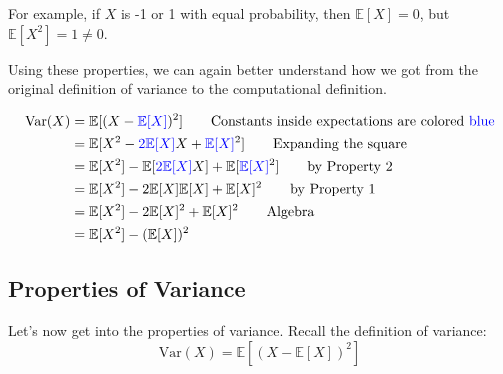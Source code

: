 \documentclass[
  letterpaper,
  DIV=11,
  numbers=noendperiod]{scrreprt}
\begin{document}
For example, if \(X\) is -1 or 1 with equal probability, then
\(\mathbb{E}[X] = 0\), but \(\mathbb{E}[X^2] = 1 \neq 0\).

Using these properties, we can again better understand how we got from
the original definition of variance to the computational definition.

\begin{tcolorbox}[enhanced jigsaw, arc=.35mm, left=2mm, toprule=.15mm, leftrule=.75mm, bottomrule=.15mm, colframe=quarto-callout-tip-color-frame, rightrule=.15mm, colbacktitle=quarto-callout-tip-color!10!white, opacitybacktitle=0.6, coltitle=black, bottomtitle=1mm, colback=white, toptitle=1mm, title=\textcolor{quarto-callout-tip-color}{\faLightbulb}\hspace{0.5em}{Proof}, breakable, opacityback=0, titlerule=0mm]

\begin{align}
   \text{Var}(X) &= \mathbb{E}[(X-\textcolor{blue}{\mathbb{E}[X]})^2] \hspace{2em} \text{Constants inside expectations are colored \textcolor{blue}{blue}} \\
   &= \mathbb{E}[X^2 - \textcolor{blue}{2\mathbb{E}[X]}X + \textcolor{blue}{\mathbb{E}[X]}^2] \hspace{2em} \text{Expanding the square}\\
   &= \mathbb{E}[X^2] - \mathbb{E}[\textcolor{blue}{2\mathbb{E}[X]}X] +\mathbb{E}[\textcolor{blue}{\mathbb{E}[X]}^2] \hspace{2em} \text{by Property 2}\\
   &= \mathbb{E}[X^2] - 2 \mathbb{E}[X]\mathbb{E}[X] +\mathbb{E}[X]^2 \hspace{2em} \text{by Property 1}\\
   &= \mathbb{E}[X^2] - 2 \mathbb{E}[X]^2 +\mathbb{E}[X]^2 \hspace{2em} \text{Algebra}\\
   &= \mathbb{E}[X^2] - (\mathbb{E}[X])^2
\end{align}

\end{tcolorbox}

\subsection{Properties of Variance}\label{properties-of-variance}

Let's now get into the properties of variance. Recall the definition of
variance: \[\text{Var}(X) = \mathbb{E}[(X-\mathbb{E}[X])^2]\]
\end{document}
